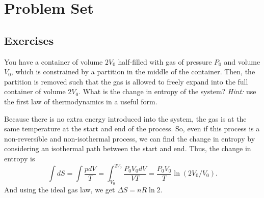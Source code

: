 \documentclass[11pt]{scrartcl}
\begin{document}
\section{Problem Set}

\subsection{Exercises}

\begin{prob}
    You have a container of volume $2V_0$ half-filled with gas of pressure $P_0$ and volume $V_0$, which is constrained by a partition in the middle of the container. Then, the partition is removed such that the gas is allowed to freely expand into the full container of volume $2V_0$. What is the change in entropy of the system? \textit{Hint:} use the first law of thermodynamics in a useful form.
\end{prob}
\begin{sol}
    Because there is no extra energy introduced into the system, the gas is at the same temperature at the start and end of the process. So, even if this process is a non-reversible and non-isothermal process, we can find the change in entropy by considering an isothermal path between the start and end. Thus, the change in entropy is
    $$\int dS = \int \frac{p dV}{T} = \int_{V_0}^{2V_0} \frac{P_0V_0 dV}{VT} = \frac{P_0V_0}{T}\ln(2V_0/V_0).$$
    And using the ideal gas law, we get $\Delta S = \boxed{nR \ln 2}.$
\end{sol}
\end{document}
